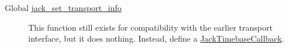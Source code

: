 \label{deprecated__deprecated000006}
\hypertarget{deprecated__deprecated000006}{}
 \begin{description}
\item[Global \hyperlink{transport_8h_8dcb2d34ae812a1ef141beb7f2f57879}{jack\_\-set\_\-transport\_\-info} ]This function still exists for compatibility with the earlier transport interface, but it does nothing. Instead, define a \hyperlink{transport_8h_60d88b9ed314f198a7487ec0e68796ee}{Jack\-Timebase\-Callback}. \end{description}
